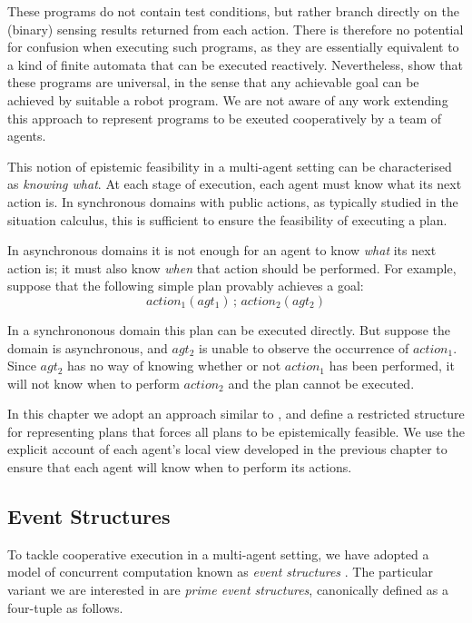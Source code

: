 These programs do not contain test conditions, but rather branch directly
on the (binary) sensing results returned from each action. There is
therefore no potential for confusion when executing such programs,
as they are essentially equivalent to a kind of finite automata that
can be executed reactively. Nevertheless, \citet{levesque98what_robots_can_do}
show that these programs are universal, in the sense that any achievable
goal can be achieved by suitable a robot program. We are not aware
of any work extending this approach to represent programs to be exeuted
cooperatively by a team of agents.

This notion of epistemic feasibility in a multi-agent setting can
be characterised as \emph{knowing what}. At each stage of execution,
each agent must know what its next action is. In synchronous domains
with public actions, as typically studied in the situation calculus,
this is sufficient to ensure the feasibility of executing a plan.

In asynchronous domains it is not enough for an agent to know \emph{what}
its next action is; it must also know \emph{when} that action should
be performed. For example, suppose that the following simple plan
provably achieves a goal:\[
action_{1}(agt_{1})\,;\, action_{2}(agt_{2})\]


In a synchrononous domain this plan can be executed directly. But
suppose the domain is asynchronous, and $agt_{2}$ is unable to observe
the occurrence of $action_{1}$. Since $agt_{2}$ has no way of knowing
whether or not $action_{1}$ has been performed, it will not know
when to perform $action_{2}$ and the plan cannot be executed.

In this chapter we adopt an approach similar to \citep{levesque98what_robots_can_do},
and define a restricted structure for representing plans that forces
all plans to be epistemically feasible. We use the explicit account
of each agent's local view developed in the previous chapter to ensure
that each agent will know when to perform its actions.


\subsection{Event Structures}

To tackle cooperative execution in a multi-agent setting, we have
adopted a model of concurrent computation known as \emph{event structures}
\citep{npw79event_structures}. The particular variant we are interested
in are \emph{prime event structures}, canonically defined as a four-tuple
as follows.

